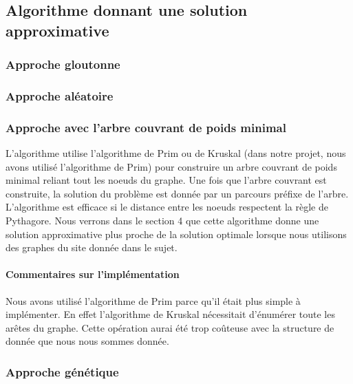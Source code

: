\documentclass[10pt,a4paper]{report}
\begin{document}
		
	\subsection{Algorithme donnant une solution approximative}
	
		\subsubsection{Approche gloutonne}
		
		\subsubsection{Approche aléatoire}
		
		\subsubsection{Approche avec l'arbre couvrant de poids minimal}
		\begin{flushleft}
		L'algorithme utilise l'algorithme de Prim ou de Kruskal (dans notre projet, nous avons utilisé l'algorithme de Prim) pour construire un arbre couvrant de poids minimal reliant tout les noeuds du graphe. Une fois que l'arbre couvrant est construite, la solution du problème est donnée par un parcours préfixe de l'arbre.
		L'algorithme est efficace si le distance entre les noeuds respectent la règle de Pythagore. Nous verrons dans le section 4 que cette algorithme donne une solution approximative plus proche de la solution optimale lorsque nous utilisons des graphes du site donnée dans le sujet.
		\end{flushleft}
		
		\paragraph{Commentaires sur l'implémentation}
		
		\begin{flushleft}
		Nous avons utilisé l'algorithme de Prim parce qu'il était plus simple à implémenter. En effet l'algorithme de Kruskal nécessitait d’énumérer toute les arêtes du graphe. Cette opération aurai été trop coûteuse avec la structure de donnée que nous nous sommes donnée.
		\end{flushleft}
		
		\subsubsection{Approche génétique}
\newpage
\end{document}
